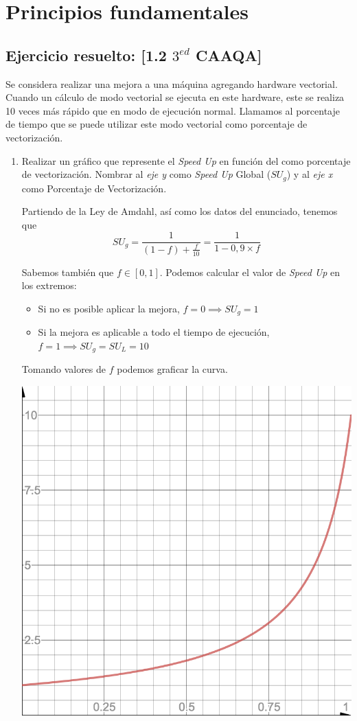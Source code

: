 \newcommand{\SU}{\textit{Speed Up }}
\section{Principios fundamentales}

\subsection{Ejercicio resuelto: [1.2 $3^{ed}$ CAAQA]}
Se considera realizar una mejora a una máquina agregando hardware vectorial. Cuando un cálculo de modo vectorial se ejecuta en este hardware, este se realiza 10 veces más rápido que en modo de ejecución normal. Llamamos al porcentaje de tiempo que se puede utilizar este modo vectorial como porcentaje de vectorización.

\begin{enumerate}
 \item Realizar un gráfico que represente el \SU en función del como porcentaje de vectorización. Nombrar al \textit{eje y} como \SU Global ($SU_g$) y al \textit{eje x} como Porcentaje de Vectorización.

 Partiendo de la Ley de Amdahl, así como los datos del enunciado, tenemos que $$ SU_g = \frac{1}{(1-f) + \frac{f}{10}} = \frac{1}{1 - 0,9 \times f}$$

 Sabemos también que $ f \in [0, 1] $. Podemos calcular el valor de \SU en los extremos:

 \begin{itemize}
 \item Si no es posible aplicar la mejora, $f = 0 \implies SU_g = 1$
 \item Si la mejora es aplicable a todo el tiempo de ejecución, $ f = 1 \implies SU_g = SU_L = 10 $
 \end{itemize}

 Tomando valores de $f$ podemos graficar la curva.

 \includegraphics[scale=0.5]{gfx/amdahl_resuelto_1.png}
 

\end{enumerate}

